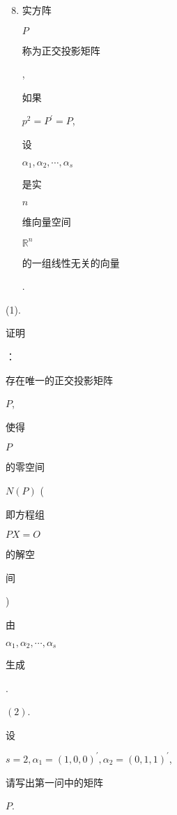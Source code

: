 \documentclass[10pt]{article}
\begin{document}
\begin{enumerate}
  \setcounter{enumi}{7}
  \item \begin{CJK}{UTF8}{mj}实方阵\end{CJK} $P$ \begin{CJK}{UTF8}{mj}称为正交投影矩阵\end{CJK}, \begin{CJK}{UTF8}{mj}如果\end{CJK} $p^{2}=P^{\prime}=P$, \begin{CJK}{UTF8}{mj}设\end{CJK} $\alpha_{1}, \alpha_{2}, \cdots, \alpha_{s}$ \begin{CJK}{UTF8}{mj}是实\end{CJK} $n$ \begin{CJK}{UTF8}{mj}维向量空间\end{CJK} $\mathbb{R}^{n}$ \begin{CJK}{UTF8}{mj}的一组线性无关的向量\end{CJK}.
\end{enumerate}
(1). \begin{CJK}{UTF8}{mj}证明\end{CJK}：\begin{CJK}{UTF8}{mj}存在唯一的正交投影矩阵\end{CJK} $P$, \begin{CJK}{UTF8}{mj}使得\end{CJK} $P$ \begin{CJK}{UTF8}{mj}的零空间\end{CJK} $N(P)$ (\begin{CJK}{UTF8}{mj}即方程组\end{CJK} $P X=O$ \begin{CJK}{UTF8}{mj}的解空\end{CJK} \begin{CJK}{UTF8}{mj}间\end{CJK}) \begin{CJK}{UTF8}{mj}由\end{CJK} $\alpha_{1}, \alpha_{2}, \cdots, \alpha_{s}$ \begin{CJK}{UTF8}{mj}生成\end{CJK}.

$(2)$. \begin{CJK}{UTF8}{mj}设\end{CJK} $s=2, \alpha_{1}=(1,0,0)^{\prime}, \alpha_{2}=(0,1,1)^{\prime}$, \begin{CJK}{UTF8}{mj}请写出第一问中的矩阵\end{CJK} $P$.
\end{document}
